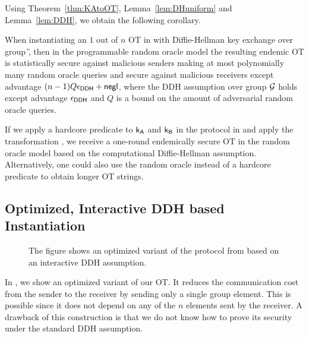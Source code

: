 Using Theorem~\ref{thm:KAtoOT}, Lemma~\ref{lem:DHuniform} and Lemma~\ref{lem:DDH}, we obtain the following corollary.

\begin{corollary}
When instantiating an $1$ out of $n$ OT in  with Diffie-Hellman key exchange over group \G, then in the programmable random oracle model the resulting endemic OT is statistically secure against malicious senders making at most polynomially many random oracle queries and secure against malicious receivers except advantage $(n-1)Q\epsilon_{\mathsf{DDH}}+\mathsf{negl}$, where the DDH assumption over group $\mathcal{G}$ holds except advantage $\epsilon_{\mathsf{DDH}}$ and $Q$ is a bound on the amount of adversarial random oracle queries.
\end{corollary}

\begin{remark}
If we apply a hardcore predicate to $\mathsf{k}_{\mathsf{A}}$ and $\mathsf{k}_{\mathsf{B}}$ in the protocol in  and apply the transformation , we receive a one-round endemically secure OT in the random oracle model based on the computational Diffie-Hellman assumption. Alternatively, one could also use the random oracle instead of a hardcore predicate to obtain longer OT strings. 
\end{remark}

\subsection{Optimized, Interactive DDH based Instantiation}\label{sec:optOT}
\begin{figure}
\centering
{}
\vspace{-0.3cm}
\caption{The figure shows an optimized variant of the protocol from  based on an interactive DDH assumption.}
\label{fig:optKAtoOT}
\end{figure}
In , we show an optimized variant of our OT. It reduces the communication cost from the sender to the receiver by sending only a single group element. This is possible since it does not depend on any of the $n$ elements sent by the receiver. A drawback of this construction is that we do not know how to prove its security under the standard DDH assumption.

